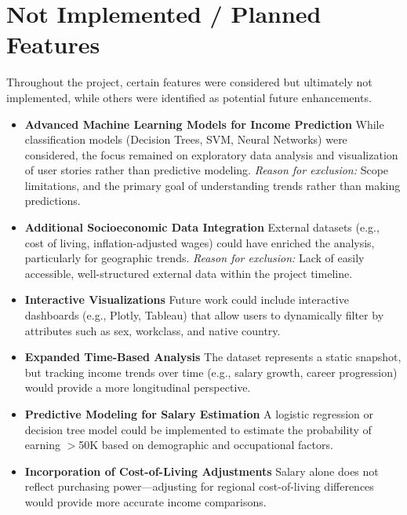 \documentclass[journal,onecolumn]{IEEEtran}
\begin{document}
\section{Not Implemented / Planned Features}

\par Throughout the project, certain features were considered but ultimately not implemented,
while others were identified as potential future enhancements.

\begin{itemize}
    \item \textbf{Advanced Machine Learning Models for Income Prediction}  
    While classification models (Decision Trees, SVM, Neural Networks) were considered, the focus remained
    on exploratory data analysis and visualization of user stories rather than predictive modeling.  
    \textit{Reason for exclusion:} Scope limitations, and the primary goal of understanding trends rather than making predictions.

    \item \textbf{Additional Socioeconomic Data Integration}  
    External datasets (e.g., cost of living, inflation-adjusted wages) could have enriched the analysis, particularly for geographic trends.  
    \textit{Reason for exclusion:} Lack of easily accessible, well-structured external data within the project timeline.

    \item \textbf{Interactive Visualizations}  
    Future work could include interactive dashboards (e.g., Plotly, Tableau) that allow users to dynamically filter
    by attributes such as sex, workclass, and native country.

    \item \textbf{Expanded Time-Based Analysis}  
    The dataset represents a static snapshot, but tracking income trends over time (e.g., salary growth, career progression)
    would provide a more longitudinal perspective.

    \item \textbf{Predictive Modeling for Salary Estimation}  
    A logistic regression or decision tree model could be implemented to estimate the probability of earning $>$50K based on demographic and occupational factors.

    \item \textbf{Incorporation of Cost-of-Living Adjustments}  
    Salary alone does not reflect purchasing power—adjusting for regional cost-of-living differences would provide more accurate income comparisons.
\end{itemize}
\end{document}
